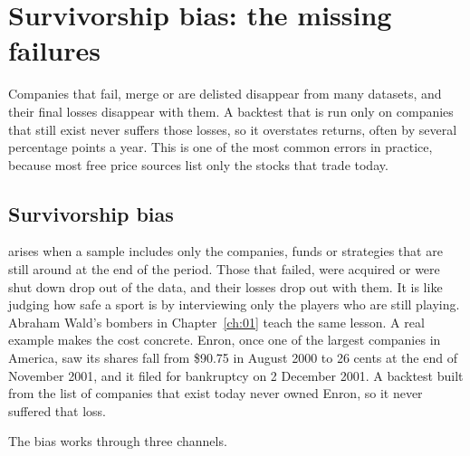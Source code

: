 \section{Survivorship bias: the missing failures}
\label{sec:02-survivorship}

Companies that fail, merge or are delisted disappear from many datasets, and their final losses disappear with them. A backtest that is run only on companies that still exist never suffers those losses, so it overstates returns, often by several percentage points a year. This is one of the most common errors in practice, because most free price sources list only the stocks that trade today.

\subsection{Survivorship bias}

 arises when a sample includes only the companies, funds or strategies that are still around at the end of the period. Those that failed, were acquired or were shut down drop out of the data, and their losses drop out with them. It is like judging how safe a sport is by interviewing only the players who are still playing. Abraham Wald's bombers in Chapter~\ref{ch:01} teach the same lesson. A real example makes the cost concrete. Enron, once one of the largest companies in America, saw its shares fall from \$90.75 in August 2000 to 26 cents at the end of November 2001, and it filed for bankruptcy on 2 December 2001. A backtest built from the list of companies that exist today never owned Enron, so it never suffered that loss.

The bias works through three channels.

